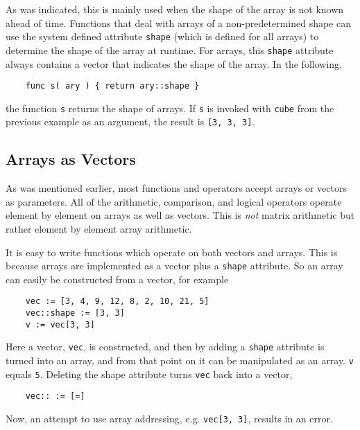As was indicated, 
this is mainly used when the shape of the array is not
known ahead of time. Functions that deal with arrays of a non-predetermined shape
can use the system defined attribute {\tt shape} (which is defined for all arrays) to 
determine the shape of the array at runtime. For arrays, this {\tt shape} 
attribute always contains a vector that indicates the shape of the array. In 
the following,
\begin{verbatim}
    func s( ary ) { return ary::shape }
\end{verbatim}
the function {\tt s} returns the shape of arrays. If {\tt s} is invoked with
{\tt cube} from the previous example as an argument, the result is {\tt [3, 3, 3]}.

\subsection{Arrays as Vectors}
\label{indexing-array-as-vectors}

As was mentioned earlier, most functions and operators accept arrays
or vectors as parameters. All  of the
arithmetic, comparison, and logical operators operate element by element
on arrays as well as vectors. This is {\em not} matrix arithmetic but
rather element by element array arithmetic.

It is easy to write functions which operate on both vectors
and arrays. This is because arrays are 
implemented as a vector plus a {\tt shape} attribute. So an array
can easily be constructed from a vector, for example
\begin{verbatim}
    vec := [3, 4, 9, 12, 8, 2, 10, 21, 5]
    vec::shape := [3, 3]
    v := vec[3, 3]
\end{verbatim}
Here a vector, {\tt vec}, is constructed, and then by adding
a {\tt shape} attribute is turned into an array, and from that point
on it can be manipulated as an array. {\tt v} equals {\tt 5}. Deleting
the shape attribute turns {\tt vec} back into a vector,
\begin{verbatim}
    vec:: := [=]
\end{verbatim}
Now, an attempt to use array addressing, e.g. {\tt vec[3, 3]}, results
in an error.

